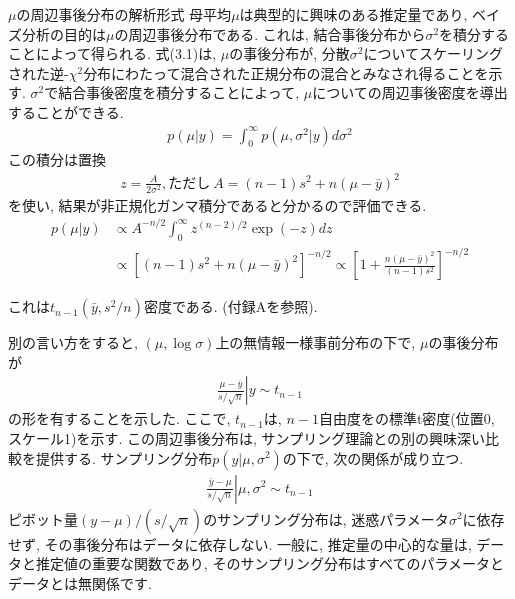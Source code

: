 \documentclass[10pt,dvipdfmx,a4]{beamer}
\newcommand{\eqn}[1]{\begin{align*}#1\end{align*}}
\begin{document}

\begin{frame}{$\mu$の周辺事後分布の解析形式}
母平均$\mu$は典型的に興味のある推定量であり, ベイズ分析の目的は$\mu$の周辺事後分布である.
これは, 結合事後分布から$\sigma^2$を積分することによって得られる.
式(3.1)は, $\mu$の事後分布が, 分散$\sigma^2$についてスケーリングされた逆-$\chi^2$分布にわたって混合された正規分布の混合とみなされ得ることを示す.
$\sigma^2$で結合事後密度を積分することによって, $\mu$についての周辺事後密度を導出することができる.
\eqn{p(\mu|y)=\int_0^{\infty}p(\mu,\sigma^2|y)d\sigma^2}
この積分は置換
\eqn{z=\frac{A}{2\sigma^2}, \text{ただし}\ A=(n-1)s^2+n(\mu-\bar{y})^2}
を使い, 結果が非正規化ガンマ積分であると分かるので評価できる.
\eqn{p(\mu|y)&\propto A^{-n/2}\int_0^{\infty}z^{(n-2)/2}\exp(-z)dz\\
&\propto [(n-1)s^2+n(\mu-\bar{y})^2]^{-n/2}
\propto \left[ 1+\frac{n(\mu-\bar{y})^2}{(n-1)s^2}\right]^{-n/2}}
\end{frame}


\begin{frame}
これは$t_{n-1}(\bar{y},s^2/n)$密度である.
(付録Aを参照).

別の言い方をすると, $(\mu, \log \sigma)$上の無情報一様事前分布の下で, $\mu$の事後分布が
\eqn{\left.\frac{\mu-\bar{y}}{s/\sqrt{n}}\right| y\sim t_{n-1}}
の形を有することを示した.
ここで, $t_{n-1}$は, $n-1$自由度をの標準t密度(位置0, スケール1)を示す.
この周辺事後分布は, サンプリング理論との別の興味深い比較を提供する.
サンプリング分布$p(y |\mu, \sigma^2)$の下で, 次の関係が成り立つ.
\eqn{\left.\frac{\bar{y}-\mu}{s/\sqrt{n}}\right| \mu,\sigma^2\sim t_{n-1}}
ピボット量$(y - \mu)/(s /\sqrt{n})$のサンプリング分布は, 迷惑パラメータ$\sigma^2$に依存せず, その事後分布はデータに依存しない.
一般に, 推定量の中心的な量は, データと推定値の重要な関数であり, そのサンプリング分布はすべてのパラメータとデータとは無関係です.
\end{frame}

\end{document}
